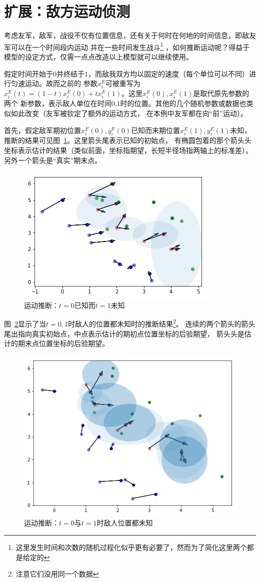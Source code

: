 \documentclass{sicnuthesis}
\begin{document}
\section{扩展：敌方运动侦测}


考虑友军，敌军，战役不仅有位置信息，还有关于何时在何地的时间信息，即敌友军可以在一个时间段内运动
并在一些时间发生战斗\footnote{这里发生时间和次数的随机过程化似乎更有必要了，然而为了简化这里两个都是给定的}
，如何推断运动呢？得益于模型的设定方式，仅需一点点改造以上模型就可以继续使用。

假定时间开始于$0$并终结于$1$，而敌我双方均以固定的速度（每个单位可以不同）进行匀速运动。故而之前的
参数$x^E_i$可被重写为$x^E_i(t) = (1-t)x^E_i(0) + tx^E_i(1)$。这里$x^E_i(0),x^E_i(1)$是取代原先参数的两个
新参数，表示敌人单位在时间0,1时的位置。其他的几个随机参数或数据也类似如此改变（友军被钦定了额外的运动方式，
在本例中友军都在向“前”运动）。

首先，假定敌军期初位置$x^E_i(0),y^E_i(0)$已知而末期位置$x^E_i(1),y^E_i(1)$未知，
推断的结果可见图~\ref{fig:bkeu}。这里箭头尾表示已知的初始点，
有椭圆包着的那个箭头头坐标表示估计的结果（类似前面，坐标指期望，长短半径场指两轴上的标准差）。
另外一个箭头是“真实”期末点。

\begin{figure}[htb]
\includegraphics[width=0.4\linewidth]{bkeu.png}
\caption{运动推断：$t=0$已知而$t=1$未知}
\label{fig:bkeu}
\end{figure}


图~\ref{fig:bueu}显示了当$t=0,1$时敌人的位置都未知时的推断结果\footnote{注意它们没用同一个数据}。
连续的两个箭头的箭头尾出指向真实初始点，中点表示估计的期初点位置坐标的后验期望，
箭头头是估计的期末点位置坐标的后验期望。

\begin{figure}[htb]
\includegraphics[width=0.6\linewidth]{bueu.png}
\caption{运动推断：$t=0$与$t=1$时敌人位置都未知}
\label{fig:bueu}
\end{figure}
\end{document}
